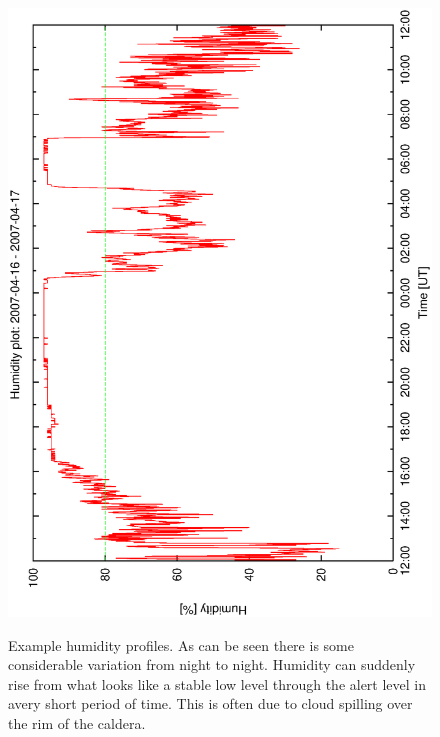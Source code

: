 \begin{figure}[htbp]
\begin{center}
{    \includegraphics[scale=0.25, angle=-90]{figures/ecs/hum_1_2007_04_16.eps}  
    \label{fig:hum_profile_2007_04_16}
  }
\end{center}  
\caption[Examples of humidity profiles.]{Example humidity profiles. As can be seen there is some considerable variation from night to night. Humidity can suddenly rise from what looks like a stable low level through the alert level in avery short period of time. This is often due to cloud spilling over the rim of the caldera.}
\label{fig:humidity_profile_examples}
\end{figure}

